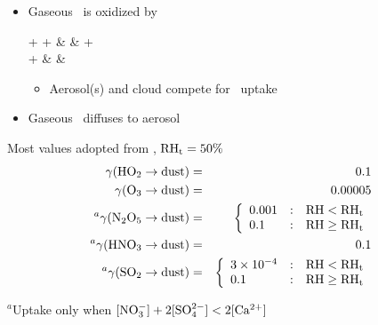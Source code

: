 \documentclass[final,dvips]{foils}
\begin{document}
\rotatefoilhead{%
\Large\textcolor{blue}{\hfill \SOx\ Chemistry \hfill}}\vspace{-0.5in}\large
\begin{itemize}
\item Gaseous \SOd\ is oxidized by \OH\ 
\begin{rxnarray}
\label{rxn:oxd_SO2_gas}
\SOd + \OH + \Od & \yields & \SOt + \HOd \\ %
\SOt + \HdO & \yields & \HdSOq %
\end{rxnarray}
\begin{itemize}
\item Aerosol(s) and cloud compete for \HdSOq\ uptake
\end{itemize}
\item Gaseous \SOd\ diffuses to aerosol 

\end{itemize}

\rotatefoilhead{%
\Large\textcolor{blue}{\hfill Reactive Uptake Coefficients for MOZART \hfill}}\vspace{-0.5in}\large
\begin{minipage}{\hsize} %
Most values adopted from \cite{DCZ96}, $\mbox{\textrm{RH}}_{\mathrm{t}} = 50\%$
\begin{eqnarray*}
\mssuptcff(\HOd \rightarrow \mbox{dust}) & = & 0.1 \\ %
\mssuptcff(\Ot \rightarrow \mbox{dust}) & = & 0.00005 \\ %
^{a}\mssuptcff(\NdOc \rightarrow \mbox{dust}) & = &\left\{
\begin{array}{l@{\quad:\quad}r}
0.001 & \RH < \RHthr \\ %
0.1 & \RH \ge \RHthr %
\end{array} \right.
\\
^{a}\mssuptcff(\HNOt \rightarrow \mbox{dust}) & = & 0.1 \\ %
^{a}\mssuptcff(\SOd \rightarrow \mbox{dust}) & = &\left\{
\begin{array}{l@{\quad:\quad}r}
3 \times 10^{-4} & \RH < \RHthr \\ %
0.1 & \RH \ge \RHthr %
\end{array} \right.
\label{eqn:mss_upt_cff_N2O5_dust}
\end{eqnarray*}
\end{minipage}
$^{a}$\footnotesize{Uptake only when $[\NOtm] + 2[\SOqdm] < 2[\Cadp]$}%
\end{document}
